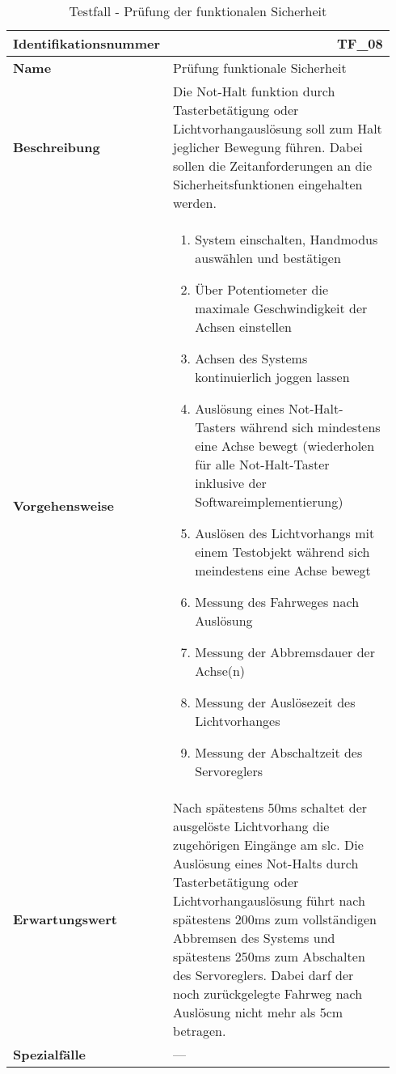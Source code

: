 \documentclass[../../../Bachelorarbeit.tex]{subfiles}
\begin{document}
\begin{table}[H]
    \centering
    \begin{tabular}{ p{0.34\linewidth}  p{0.6\linewidth} }
        \hline
        \textbf{Identifikationsnummer}  & \multicolumn{1}{r}{TF\_08} \\ \hline
        \textbf{Name}                   & Prüfung funktionale Sicherheit \\
        \textbf{Beschreibung}           & Die Not-Halt funktion durch Tasterbetätigung oder Lichtvorhangauslösung soll zum Halt jeglicher Bewegung führen. Dabei sollen die Zeitanforderungen an die Sicherheitsfunktionen eingehalten werden. \\
        \textbf{Vorgehensweise}         &   {\begin{enumerate}[noitemsep,topsep=0pt,parsep=0pt,partopsep=0pt,leftmargin=*]
                                                \item System einschalten, Handmodus auswählen und bestätigen
                                                \item Über Potentiometer die maximale Geschwindigkeit der Achsen einstellen
                                                \item Achsen des Systems kontinuierlich joggen lassen
                                                \item Auslösung eines Not-Halt-Tasters während sich mindestens eine Achse bewegt (wiederholen für alle Not-Halt-Taster inklusive der Softwareimplementierung)
                                                \item Auslösen des Lichtvorhangs mit einem Testobjekt während sich meindestens eine Achse bewegt
                                                \item Messung des Fahrweges nach Auslösung
                                                \item Messung der Abbremsdauer der Achse(n)
                                                \item Messung der Auslösezeit des Lichtvorhanges
                                                \item Messung der Abschaltzeit des Servoreglers
                                            \end{enumerate}} \\
        \textbf{Erwartungswert}         & Nach spätestens 50\si{ms} schaltet der ausgelöste Lichtvorhang die zugehörigen Eingänge am \acs{slc}. Die Auslösung eines Not-Halts durch Tasterbetätigung oder Lichtvorhangauslösung führt nach spätestens 200\si{ms} zum vollständigen Abbremsen des Systems und spätestens 250\si{ms} zum Abschalten des Servoreglers. Dabei darf der noch zurückgelegte Fahrweg nach Auslösung nicht mehr als 5cm betragen. \\
        \textbf{Spezialfälle}           & --- \\ \hline
    \end{tabular}
    \caption[\acs{tf} - Funktionale Sicherheit]{Testfall - Prüfung der funktionalen Sicherheit}
    \label{tab:my-table67}
\end{table}
\end{document}
